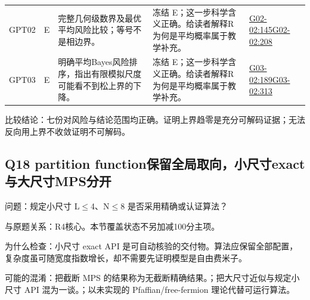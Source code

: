 \documentclass[11pt,a4paper]{article}
\begin{document}
{\begin{longtable}
{}GPT02 & E & 完整几何级数界及最优平均风险比较；等号不是相边界。 & 冻结 E；这一步科学含义正确。给读者解释R为何是平均概率属于教学补充。 & \hyperref[src:G02-02]{G02-02:145}\newline \hyperref[src:G02-02]{G02-02:208}\tabularnewline
{}GPT03 & E & 明确平均Bayes风险排序，指出有限模拟尺度可能看不到松上界的下降。 & 冻结 E；这一步科学含义正确。给读者解释R为何是平均概率属于教学补充。 & \hyperref[src:G03-02]{G03-02:189}\newline \hyperref[src:G03-02]{G03-02:313}\tabularnewline
\bottomrule
\end{longtable}
}
比较结论：七份对风险与结论范围均正确。证明上界趋零是充分可解码证据；无法反向用上界不收敛证明不可解码。

\clearpage
\subsection{Q18 partition function保留全局取向，小尺寸exact与大尺寸MPS分开}
\label{aspect:Q18}
问题：规定小尺寸 L\ensuremath{\leq}4、N\ensuremath{\leq}8 是否采用精确或认证算法？

与原题关系：R4核心。本节覆盖状态不另加减100分主项。

为什么检查：小尺寸 exact API 是可自动核验的交付物。算法应保留全部配置，复杂度虽可随宽度指数增长，却不需要先证明模型是自由费米子。

可能的混淆：把截断 MPS 的结果称为无截断精确结果。；把大尺寸近似与规定小尺寸 API 混为一谈。；以未实现的 Pfaffian/free-fermion 理论代替可运行算法。
\end{document}

